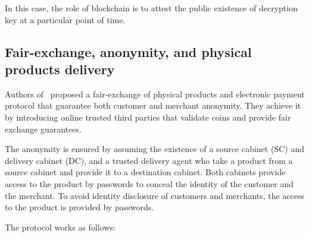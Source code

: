 \documentclass{ieeeaccess}
\begin{document}
In this case, the role of blockchain is to attest the public existence of decryption key at a particular point of time.

\subsection{Fair-exchange, anonymity, and physical products delivery} 
\label{anonymity-and-fair-exchange-in-e-commerce-protocol-for-physical-products-delivery}

Authors of~\cite{birjoveanu2015anonymity} proposed a
fair-exchange of physical products and electronic payment protocol that
guarantee both customer and merchant anonymity. They achieve it by
introducing online trusted third parties that validate coins and provide
fair exchange guarantees.

The anonymity is ensured by assuming the existence of a source cabinet
(SC) and delivery cabinet (DC), and a trusted delivery agent who take
a product from a source cabinet and provide it to a destination cabinet.
Both cabinets provide access to the product by passwords to conceal
the identity of the customer and the merchant. To avoid identity disclosure
of customers and merchants, the access to the product is provided by
passwords.

The protocol works as follows: \begingroup
\renewcommand{\labelenumii}{\arabic{enumii}.}
\end{document}
